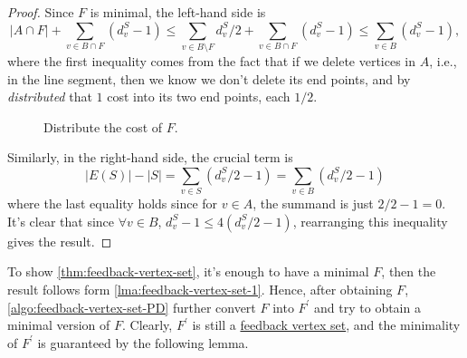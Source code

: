 \begin{proof}
	Since \(F\) is minimal, the left-hand side is
	\[
		\left\vert A \cap  F \right\vert + \sum_{v\in B \cap F}(d_{v} ^S - 1) \leq \sum_{v\in B \setminus F} d_{v} ^S / 2 + \sum_{v\in B \cap F}(d_{v} ^S - 1) \leq \sum_{v\in B}(d_{v}^S - 1 ),
	\]
	where the first inequality comes from the fact that if we delete vertices in \(A\), i.e., in the line segment, then we know we don't delete its end points, and by \emph{distributed} that \(1\) cost into its two end points, each \(1 / 2\).
	\begin{figure}[H]
		\centering
		\caption{Distribute the cost of \(F\).}
		\label{fig:FBV-line-segment}
	\end{figure}
	Similarly, in the right-hand side, the crucial term is
	\[
		\left\vert E(S) \right\vert - \left\vert S \right\vert = \sum_{v\in S}(d_{v} ^S / 2 - 1) = \sum_{v\in B} (d_{v} ^S / 2 - 1)
	\]
	where the last equality holds since for \(v\in A\), the summand is just \(2 / 2 - 1 = 0\). It's clear that since \(\forall v\in B\), \(d_v^S - 1 \leq 4 (d_{v} ^S / 2 - 1)\), rearranging this inequality gives the result.
\end{proof}

To show \autoref{thm:feedback-vertex-set}, it's enough to have a minimal \(F\), then the result follows form \autoref{lma:feedback-vertex-set-1}. Hence, after obtaining \(F\), \autoref{algo:feedback-vertex-set-PD} further convert \(F\) into \(F^\prime \) and  try to obtain a minimal version of \(F\). Clearly, \(F^\prime \) is still a \hyperref[prb:feedback-vertex-set]{feedback vertex set}, and the minimality of \(F^\prime \) is guaranteed by the following lemma.

